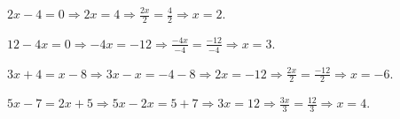 \begin{alist}
\item $ 2x-4=0\Rightarrow 2x=4\Rightarrow \frac{2x}{2}=\frac{4}{2}\Rightarrow x=2 $.
\item $ 12-4x=0\Rightarrow -4x=-12\Rightarrow \frac{-4x}{-4}=\frac{-12}{-4}\Rightarrow x=3 $.
\item $ 3x+4=x-8\Rightarrow 3x-x=-4-8\Rightarrow 2x=-12\Rightarrow \frac{2x}{2}=\frac{-12}{2}\Rightarrow x=-6 $.
\item $ 5x-7=2x+5\Rightarrow 5x-2x=5+7\Rightarrow 3x=12\Rightarrow \frac{3x}{3}=\frac{12}{3}\Rightarrow x=4 $.
\end{alist}

